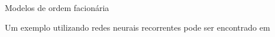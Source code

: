 Modelos de ordem facionária \cite{li-etal:25-ordem-fracionaria}

Um exemplo utilizando redes neurais recorrentes pode ser encontrado 
em \cite{rodriguez-etal:2022-einns}

 \cite{long-etal:21-L2}

